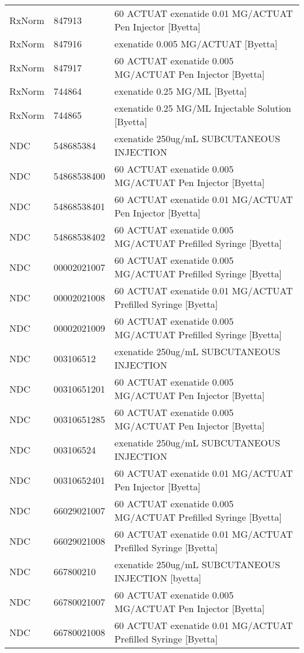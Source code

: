 \begin{longtable}{p{}p{}p{}}
  RxNorm & 847913 & 60 ACTUAT exenatide 0.01 MG/ACTUAT Pen Injector [Byetta] \\ 
  RxNorm & 847916 & exenatide 0.005 MG/ACTUAT [Byetta] \\ 
  RxNorm & 847917 & 60 ACTUAT exenatide 0.005 MG/ACTUAT Pen Injector [Byetta] \\ 
  RxNorm & 744864 & exenatide 0.25 MG/ML [Byetta] \\ 
  RxNorm & 744865 & exenatide 0.25 MG/ML Injectable Solution [Byetta] \\ 
  NDC & 548685384 & exenatide 250ug/mL SUBCUTANEOUS INJECTION \\ 
  NDC & 54868538400 & 60 ACTUAT exenatide 0.005 MG/ACTUAT Pen Injector [Byetta] \\ 
  NDC & 54868538401 & 60 ACTUAT exenatide 0.01 MG/ACTUAT Pen Injector [Byetta] \\ 
  NDC & 54868538402 & 60 ACTUAT exenatide 0.005 MG/ACTUAT Prefilled Syringe [Byetta] \\ 
  NDC & 00002021007 & 60 ACTUAT exenatide 0.005 MG/ACTUAT Prefilled Syringe [Byetta] \\ 
  NDC & 00002021008 & 60 ACTUAT exenatide 0.01 MG/ACTUAT Prefilled Syringe [Byetta] \\ 
  NDC & 00002021009 & 60 ACTUAT exenatide 0.005 MG/ACTUAT Prefilled Syringe [Byetta] \\ 
  NDC & 003106512 & exenatide 250ug/mL SUBCUTANEOUS INJECTION \\ 
  NDC & 00310651201 & 60 ACTUAT exenatide 0.005 MG/ACTUAT Pen Injector [Byetta] \\ 
  NDC & 00310651285 & 60 ACTUAT exenatide 0.005 MG/ACTUAT Pen Injector [Byetta] \\ 
  NDC & 003106524 & exenatide 250ug/mL SUBCUTANEOUS INJECTION \\ 
  NDC & 00310652401 & 60 ACTUAT exenatide 0.01 MG/ACTUAT Pen Injector [Byetta] \\ 
  NDC & 66029021007 & 60 ACTUAT exenatide 0.005 MG/ACTUAT Prefilled Syringe [Byetta] \\ 
  NDC & 66029021008 & 60 ACTUAT exenatide 0.01 MG/ACTUAT Prefilled Syringe [Byetta] \\ 
  NDC & 667800210 & exenatide 250ug/mL SUBCUTANEOUS INJECTION [byetta] \\ 
  NDC & 66780021007 & 60 ACTUAT exenatide 0.005 MG/ACTUAT Pen Injector [Byetta] \\ 
  NDC & 66780021008 & 60 ACTUAT exenatide 0.01 MG/ACTUAT Prefilled Syringe [Byetta] \\ 

\end{longtable}
